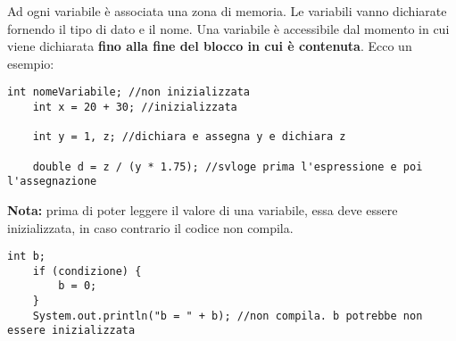 \documentclass[../main.tex]{subfiles}
\begin{document}
Ad ogni variabile è associata una zona di memoria. Le variabili vanno dichiarate fornendo il tipo di dato e il nome.
Una variabile è accessibile dal momento in cui viene dichiarata \textbf{fino alla fine del blocco in cui è contenuta}. Ecco un esempio:
\begin{lstlisting}[style=java]
    int nomeVariabile; //non inizializzata
    int x = 20 + 30; //inizializzata

    int y = 1, z; //dichiara e assegna y e dichiara z

    double d = z / (y * 1.75); //svloge prima l'espressione e poi l'assegnazione
\end{lstlisting}
\vspace{0.5cm}
\textbf{Nota:} prima di poter leggere il valore di una variabile, essa deve essere inizializzata, in caso contrario il codice non compila.
\begin{lstlisting}[style=java]
    int b;
    if (condizione) {
        b = 0;
    }
    System.out.println("b = " + b); //non compila. b potrebbe non essere inizializzata
\end{lstlisting}
\end{document}
